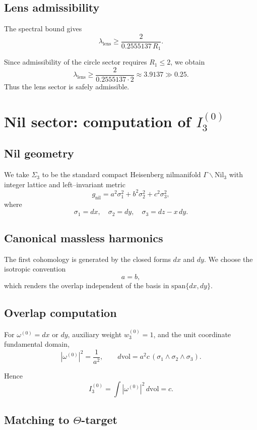 \documentclass[11pt]{article}
\begin{document}
\subsection{Lens admissibility}

The spectral bound gives
\[
\lambda_{\mathrm{lens}} \ge \frac{2}{0.2555137\,R_1}.
\]

Since admissibility of the circle sector requires $R_1\le 2$,
we obtain
\[
\lambda_{\mathrm{lens}}
\ge \frac{2}{0.2555137\cdot 2}
\approx 3.9137 \gg 0.25.
\]
Thus the lens sector is safely admissible.

\section{Nil sector: computation of
\texorpdfstring{$I_3^{(0)}$}{I3(0)}}

\subsection{Nil geometry}

We take $\Sigma_3$ to be the standard compact Heisenberg nilmanifold
$\Gamma\backslash\mathrm{Nil}_3$ with integer lattice and
left--invariant metric
\[
g_{\mathrm{nil}} = a^2\sigma_1^2 + b^2\sigma_2^2 + c^2\sigma_3^2,
\]
where
\[
\sigma_1=dx,\quad \sigma_2=dy,\quad \sigma_3=dz-x\,dy.
\]

\subsection{Canonical massless harmonics}

The first cohomology is generated by the closed forms $dx$ and $dy$.
We choose the isotropic convention
\[
a=b,
\]
which renders the overlap independent of the basis in
$\mathrm{span}\{dx,dy\}$.

\subsection{Overlap computation}

For $\omega^{(0)}=dx$ or $dy$, auxiliary weight $w_3^{(0)}=1$, and the unit
coordinate fundamental domain,
\[
|\omega^{(0)}|^2 = \frac{1}{a^2},
\qquad
d\mathrm{vol} = a^2 c\,(\sigma_1\wedge\sigma_2\wedge\sigma_3).
\]

Hence
\[
I_3^{(0)} = \int |\omega^{(0)}|^2\,d\mathrm{vol} = c.
\]

\subsection{Matching to \texorpdfstring{$\Theta$}{Theta}-target}
\end{document}
